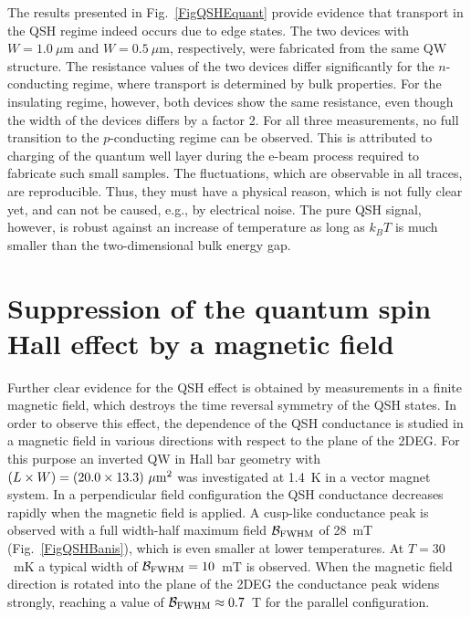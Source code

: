 \documentclass{article}
\begin{document}
The results presented in Fig.~\ref{FigQSHEquant} provide evidence
that transport in the QSH regime indeed occurs due to edge states.
The two devices with $W=1.0~\mu$m and $W=0.5~\mu$m, respectively,
were fabricated from the same QW structure. The resistance values of
the two devices differ significantly for the $n$-conducting regime,
where transport is determined by bulk properties. For the insulating
regime, however, both devices show the same resistance, even though
the width of the devices differs by a factor 2. For all three
measurements, no full transition to the $p$-conducting regime can be
observed. This is attributed to charging of the quantum well layer
during the e-beam process required to fabricate such small samples.
The fluctuations, which are observable in all traces, are
reproducible. Thus, they must have a physical reason, which is not
fully clear yet, and can not be caused, e.g., by electrical noise.
The pure QSH signal, however, is robust against an increase of
temperature as long as $k_BT$ is much smaller than the
two-dimensional bulk energy gap.

\section{Suppression of the quantum spin Hall effect by a magnetic field}

Further clear evidence for the QSH effect is obtained by
measurements in a finite magnetic field, which destroys the time
reversal symmetry of the QSH states. In order to observe this
effect, the dependence of the QSH conductance is studied in a
magnetic field in various directions with respect to the plane of
the 2DEG. For this purpose an inverted QW in Hall bar geometry
with $(L\times W) = (20.0\times13.3)~\mu{\rm m}^2$ was
investigated at 1.4~K in a vector magnet system. In a
perpendicular field configuration the QSH conductance decreases
rapidly when the magnetic field is applied. A cusp-like
conductance peak is observed with a full width-half maximum field
${\cal{B}}_{\rm FWHM}$ of 28~mT (Fig.~\ref{FigQSHBanis}), which is
even smaller at lower temperatures. At $T = 30$~mK a typical width
of ${\cal{B}}_{\rm FWHM}=10$~mT is observed. When the magnetic
field direction is rotated into the plane of the 2DEG the
conductance peak widens strongly, reaching a value of
${\cal{B}}_{\rm FWHM}\approx0.7$~T for the parallel configuration.
\end{document}
